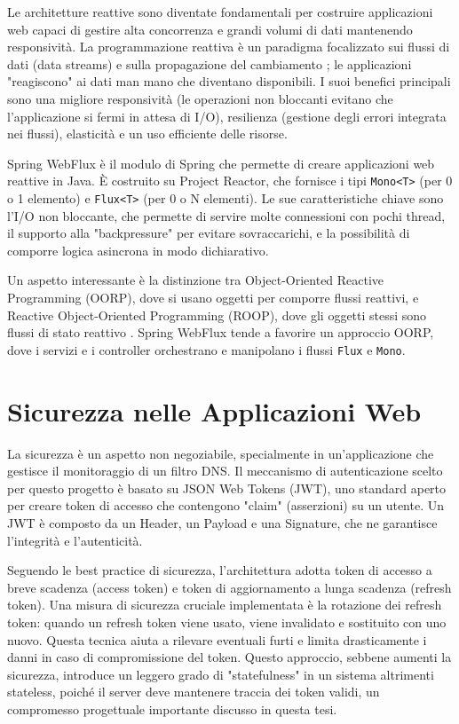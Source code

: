 \documentclass[12pt,a4paper,openright,twoside]{book}
\begin{document}
Le architetture reattive sono diventate fondamentali per costruire applicazioni web capaci di gestire alta concorrenza e grandi volumi di dati mantenendo responsività.  La programmazione reattiva è un paradigma focalizzato sui flussi di dati (data streams) e sulla propagazione del cambiamento \cite{WikipediaReactive}; le applicazioni "reagiscono" ai dati man mano che diventano disponibili.  I suoi benefici principali sono una migliore responsività (le operazioni non bloccanti evitano che l'applicazione si fermi in attesa di I/O), resilienza (gestione degli errori integrata nei flussi), elasticità e un uso efficiente delle risorse. 

Spring WebFlux è il modulo di Spring che permette di creare applicazioni web reattive in Java.  È costruito su Project Reactor, che fornisce i tipi \texttt{Mono<T>} (per 0 o 1 elemento) e \texttt{Flux<T>} (per 0 o N elementi).  Le sue caratteristiche chiave sono l'I/O non bloccante, che permette di servire molte connessioni con pochi thread, il supporto alla "backpressure" per evitare sovraccarichi, e la possibilità di comporre logica asincrona in modo dichiarativo. 

Un aspetto interessante è la distinzione tra Object-Oriented Reactive Programming (OORP), dove si usano oggetti per comporre flussi reattivi, e Reactive Object-Oriented Programming (ROOP), dove gli oggetti stessi sono flussi di stato reattivo \cite{Boix2013OORP}.  Spring WebFlux tende a favorire un approccio OORP, dove i servizi e i controller orchestrano e manipolano i flussi \texttt{Flux} e \texttt{Mono}. 

\section{Sicurezza nelle Applicazioni Web}
\label{sec:sicurezza_web}

La sicurezza è un aspetto non negoziabile, specialmente in un'applicazione che gestisce il monitoraggio di un filtro DNS.  Il meccanismo di autenticazione scelto per questo progetto è basato su JSON Web Tokens (JWT), uno standard aperto per creare token di accesso che contengono "claim" (asserzioni) su un utente.  Un JWT è composto da un Header, un Payload e una Signature, che ne garantisce l'integrità e l'autenticità. 

Seguendo le best practice di sicurezza, l'architettura adotta token di accesso a breve scadenza (access token) e token di aggiornamento a lunga scadenza (refresh token).  Una misura di sicurezza cruciale implementata è la rotazione dei refresh token: quando un refresh token viene usato, viene invalidato e sostituito con uno nuovo.  Questa tecnica aiuta a rilevare eventuali furti e limita drasticamente i danni in caso di compromissione del token.  Questo approccio, sebbene aumenti la sicurezza, introduce un leggero grado di "statefulness" in un sistema altrimenti stateless, poiché il server deve mantenere traccia dei token validi, un compromesso progettuale importante discusso in questa tesi. 
\end{document}
